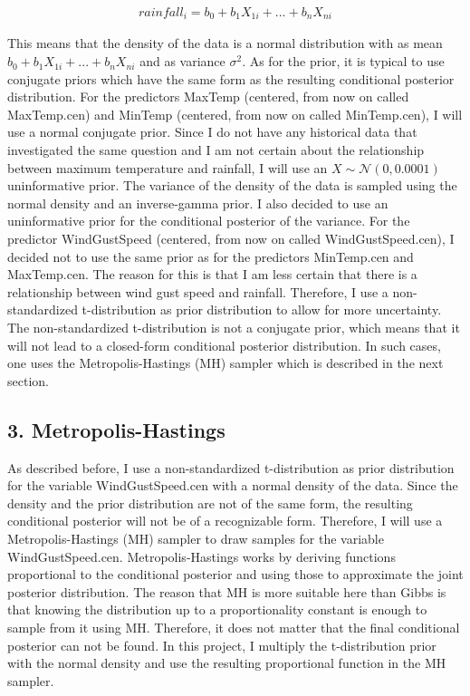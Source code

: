 \documentclass[
]{article}
\begin{document}
\begin{align}
  rainfall_i = b_0 + b_{1}X_{1i} + ... + b_{n}X_{ni}
\end{align}

This means that the density of the data is a normal distribution with as
mean \(b_0 + b_{1}X_{1i} + ... + b_{n}X_{ni}\) and as variance
\(\sigma^2\). As for the prior, it is typical to use conjugate priors
which have the same form as the resulting conditional posterior
distribution. For the predictors MaxTemp (centered, from now on called
MaxTemp.cen) and MinTemp (centered, from now on called MinTemp.cen), I
will use a normal conjugate prior. Since I do not have any historical
data that investigated the same question and I am not certain about the
relationship between maximum temperature and rainfall, I will use an
\(X \sim \mathcal{N}(0,0.0001)\) uninformative prior. The variance of
the density of the data is sampled using the normal density and an
inverse-gamma prior. I also decided to use an uninformative prior for
the conditional posterior of the variance. For the predictor
WindGustSpeed (centered, from now on called WindGustSpeed.cen), I
decided not to use the same prior as for the predictors MinTemp.cen and
MaxTemp.cen. The reason for this is that I am less certain that there is
a relationship between wind gust speed and rainfall. Therefore, I use a
non-standardized t-distribution as prior distribution to allow for more
uncertainty. The non-standardized t-distribution is not a conjugate
prior, which means that it will not lead to a closed-form conditional
posterior distribution. In such cases, one uses the Metropolis-Hastings
(MH) sampler which is described in the next section.

\hypertarget{metropolis-hastings}{%
\subsection{3. Metropolis-Hastings}\label{metropolis-hastings}}

As described before, I use a non-standardized t-distribution as prior
distribution for the variable WindGustSpeed.cen with a normal density of
the data. Since the density and the prior distribution are not of the
same form, the resulting conditional posterior will not be of a
recognizable form. Therefore, I will use a Metropolis-Hastings (MH)
sampler to draw samples for the variable WindGustSpeed.cen.
Metropolis-Hastings works by deriving functions proportional to the
conditional posterior and using those to approximate the joint posterior
distribution. The reason that MH is more suitable here than Gibbs is
that knowing the distribution up to a proportionality constant is enough
to sample from it using MH. Therefore, it does not matter that the final
conditional posterior can not be found. In this project, I multiply the
t-distribution prior with the normal density and use the resulting
proportional function in the MH sampler.
\end{document}
